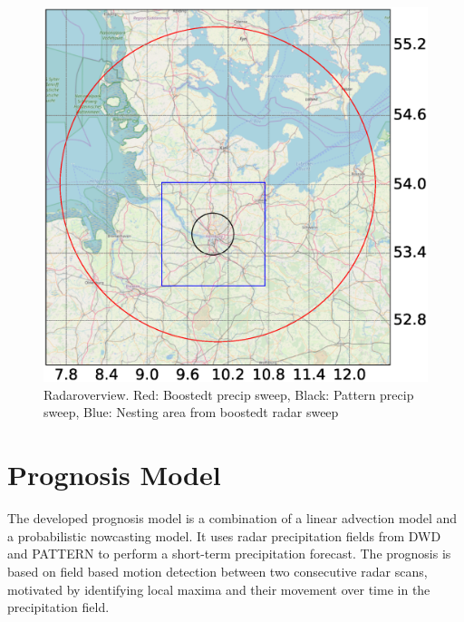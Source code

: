 \documentclass[11pt,twoside,a4paper,fleqn,x11names]{report}
\numberwithin{equation}{chapter}
\numberwithin{figure}{chapter}
\numberwithin{table}{chapter}
\begin{document}
\begin{figure}
	\centering
	\includegraphics[width=\textwidth,trim={0 0 0 0}, clip]{radarOverview.eps}
	\caption{Radaroverview. Red: Boostedt precip sweep, Black: Pattern precip sweep, Blue: Nesting area from boostedt radar sweep}
	\label{fig:radarOverview}
\end{figure}
\chapter{Prognosis Model}
The developed prognosis model is a combination of a linear advection model and a probabilistic nowcasting model. It uses radar precipitation fields from DWD and PATTERN to perform a short-term precipitation forecast. The prognosis is based on field based motion detection between two consecutive radar scans, motivated by identifying local maxima and their movement over time in the precipitation field.
\end{document}
